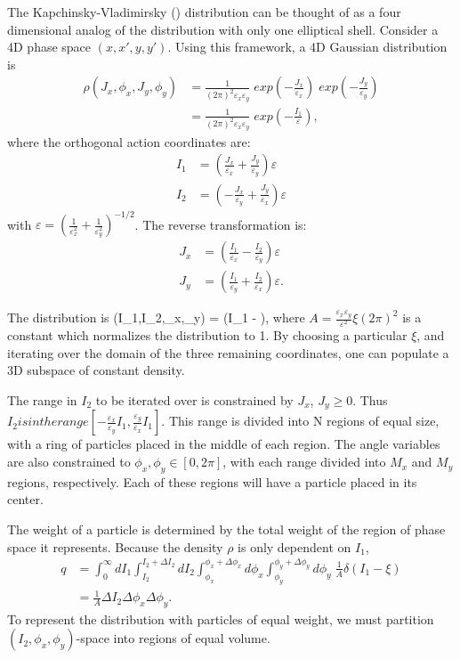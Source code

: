 The Kapchinsky-Vladimirsky () distribution can be thought of as
a four dimensional analog of the  distribution with only one
elliptical shell. Consider a 4D phase space $(x,x', y,y')$.  
Using this framework, a 4D Gaussian distribution is
\begin{align}
  \rho(J_x, \phi_x, J_y, \phi_y) &= 
    \frac{1}{(2\pi)^2 \varepsilon_x \varepsilon_y}\; 
    exp(-\frac{J_x}{\varepsilon_x})\; exp(-\frac{J_y} {\varepsilon_y}) \\
  &= \frac{1}{(2\pi)^2 \varepsilon_x \varepsilon_y}\; 
    exp(-\frac{I_1}{\varepsilon}) ,
\end{align}
where the orthogonal action coordinates are:
\begin{align}
  I_1 &= \left(  \frac{J_x}{\varepsilon_x} + \frac{J_y}{\varepsilon_y} \right) \varepsilon \\
  I_2 &= \left( -\frac{J_x}{\varepsilon_y} + \frac{J_y}{\varepsilon_x} \right) \varepsilon
\end{align}
with $\varepsilon = (\frac{1}{\varepsilon_x^2} + \frac{1}{\varepsilon_y^2})^{-1/2}$.  
The reverse transformation is:
\begin{align}
   J_x & = \left( \frac{I_1}{\varepsilon_x} - \frac{I_2}{\varepsilon_y} \right) 
      \varepsilon  \\
   J_y & = \left( \frac{I_1}{\varepsilon_y} + \frac{I_2}{\varepsilon_x} \right) 
      \varepsilon.
\end{align}

The  distribution is
\Begineq
  \rho(I_1,I_2,\phi_x,\phi_y) =  \delta(I_1 - \xi),
\Endeq
where $A = \frac{\varepsilon_x \varepsilon_y}{\varepsilon^2} \xi (2\pi)^2$ 
is a constant which normalizes the distribution to 1.  
By choosing a particular $\xi$, and iterating over the domain of the three remaining
coordinates, one can populate a 3D subspace of constant density.

The range in $I_2$ to be iterated over is constrained by $J_x$, $J_y \geq 0$.  
Thus $I_2 is in the range [-\frac{\varepsilon_x}{\varepsilon_y} I_1, 
\frac{\varepsilon_y}{\varepsilon_x} I_1]$. 
This range is divided into N regions of equal size, with a ring of 
particles placed in the middle of each region.  
The angle variables are also constrained to $\phi_x, \phi_y \in [0, 2\pi]$, 
with each range divided into $M_x$ and $M_y$ regions, respectively.  
Each of these regions will have a particle placed in its center.

The weight of a particle is determined by the total weight of the region 
of phase space it represents.  
Because the density $\rho$ is only dependent on $I_1$,
\begin{align}
   q &= \int_{0}^{\infty} dI_1 \int_{I_2}^{I_2 + \Delta I_2} 
     dI_2 \int_{\phi_x}^{\phi_x + \Delta \phi_x} d\phi_x 
    \int_{\phi_y}^{\phi_y + \Delta \phi_y} d\phi_y \; \frac{1}{A} \delta(I_1 - \xi) \\
   &= \frac{1}{A} \Delta I_2 \Delta \phi_x \Delta \phi_y.
\end{align}
To represent the distribution with particles of equal weight, 
we must partition $(I_2,\phi_x,\phi_y)$-space into regions of equal volume.

